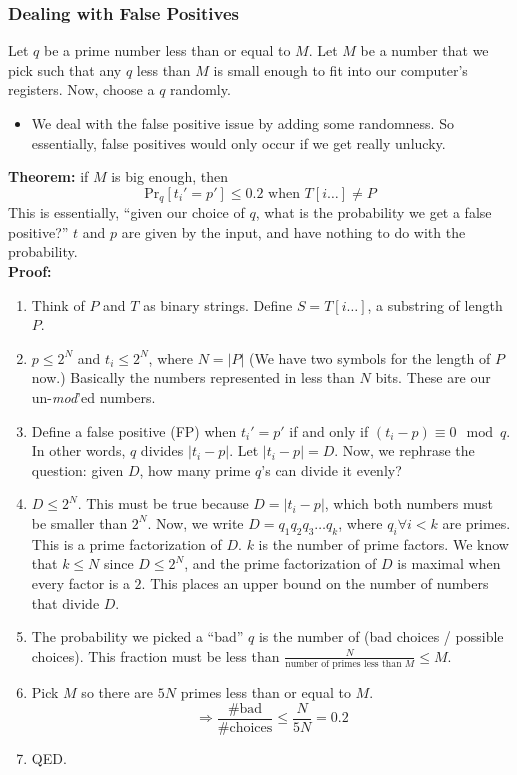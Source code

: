 \documentclass[10pt]{article}
\begin{document}
\subsubsection*{Dealing with False Positives}
Let $q$ be a prime number less than or equal to $M$.  Let $M$ be a number that we pick such that any $q$ less than $M$ is small enough to fit into our computer's registers.  Now, choose a $q$ randomly.
\begin{itemize}
	\item We deal with the false positive issue by adding some randomness.  So essentially, false positives would only occur if we get really unlucky.
\end{itemize}
\textbf{Theorem:} if $M$ is big enough, then
\[\text{Pr}_q[t_i' = p'] \leq 0.2 \text{ when } T[i\dots] \neq P\]
This is essentially, ``given our choice of $q$, what is the probability we get a false positive?''  $t$ and $p$ are given by the input, and have nothing to do with the probability.\\
\textbf{Proof:} 
\begin{enumerate}
    \item Think of $P$ and $T$ as binary strings.  Define $S = T[i\dots]$, a substring of length $P$.
    \item $p \leq 2^N$ and $t_i \leq 2^N$, where $N = |P|$ (We have two symbols for the length of $P$ now.)  Basically the numbers represented in less than $N$ bits.  These are our un-\textit{mod}'ed numbers.
    \item Define a false positive (FP) when $t_i' = p'$ if and only if $(t_i - p) \equiv 0 \mod q$.  In other words, $q$ divides $|t_i - p|$.  Let $|t_i - p| = D$.  Now, we rephrase the question: given $D$, how many prime $q$'s can divide it evenly?
    \item $D \leq 2^N$.  This must be true because $D = |t_i - p|$, which both numbers must be smaller than $2^N$.  Now, we write $D = q_1 q_2 q_3 \dots q_k$, where $q_i \forall i < k$ are primes.  This is a prime factorization of $D$.  $k$ is the number of prime factors.  We know that $k \leq N$ since $D \leq 2^N$, and the prime factorization of $D$ is maximal when every factor is a $2$.  This places an upper bound on the number of numbers that divide $D$.
    \item The probability we picked a ``bad'' $q$ is the number of (bad choices / possible choices).  This fraction must be less than $\frac{N}{\text{number of primes less than }M} \leq M$.
    \item Pick $M$ so there are $5N$ primes less than or equal to $M$.  
    \[\Rightarrow \frac{\text{\# bad}}{\text{\# choices}} \leq \frac{N}{5N} = 0.2\]
    \item QED.
\end{enumerate}
\end{document}
